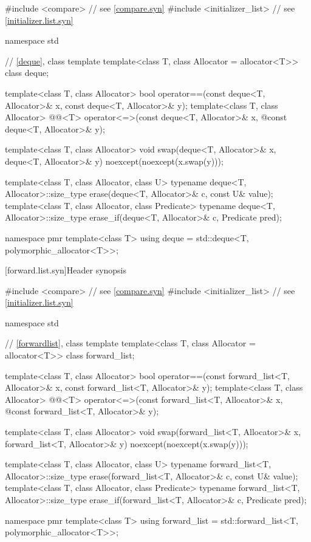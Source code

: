 %
\begin{codeblock}
#include <compare>              // see \ref{compare.syn}
#include <initializer_list>     // see \ref{initializer.list.syn}

namespace std {
  // \ref{deque}, class template 
  template<class T, class Allocator = allocator<T>> class deque;

  template<class T, class Allocator>
    bool operator==(const deque<T, Allocator>& x, const deque<T, Allocator>& y);
  template<class T, class Allocator>
    @@<T> operator<=>(const deque<T, Allocator>& x,
    @\itcorr@                                      const deque<T, Allocator>& y);

  template<class T, class Allocator>
    void swap(deque<T, Allocator>& x, deque<T, Allocator>& y)
      noexcept(noexcept(x.swap(y)));

  template<class T, class Allocator, class U>
    typename deque<T, Allocator>::size_type
      erase(deque<T, Allocator>& c, const U& value);
  template<class T, class Allocator, class Predicate>
    typename deque<T, Allocator>::size_type
      erase_if(deque<T, Allocator>& c, Predicate pred);

  namespace pmr {
    template<class T>
      using deque = std::deque<T, polymorphic_allocator<T>>;
  }
}
\end{codeblock}

[forward.list.syn]{Header  synopsis}

%
\begin{codeblock}
#include <compare>              // see \ref{compare.syn}
#include <initializer_list>     // see \ref{initializer.list.syn}

namespace std {
  // \ref{forwardlist}, class template 
  template<class T, class Allocator = allocator<T>> class forward_list;

  template<class T, class Allocator>
    bool operator==(const forward_list<T, Allocator>& x, const forward_list<T, Allocator>& y);
  template<class T, class Allocator>
    @@<T> operator<=>(const forward_list<T, Allocator>& x,
    @\itcorr@                                      const forward_list<T, Allocator>& y);

  template<class T, class Allocator>
    void swap(forward_list<T, Allocator>& x, forward_list<T, Allocator>& y)
      noexcept(noexcept(x.swap(y)));

  template<class T, class Allocator, class U>
    typename forward_list<T, Allocator>::size_type
      erase(forward_list<T, Allocator>& c, const U& value);
  template<class T, class Allocator, class Predicate>
    typename forward_list<T, Allocator>::size_type
      erase_if(forward_list<T, Allocator>& c, Predicate pred);

  namespace pmr {
    template<class T>
      using forward_list = std::forward_list<T, polymorphic_allocator<T>>;
  }
}
\end{codeblock}

